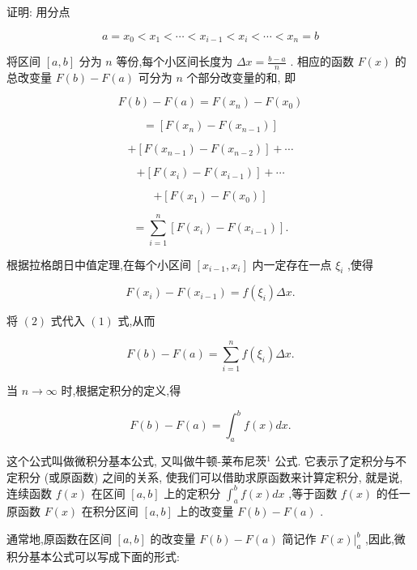 \documentclass[lang=cn,newtx,12pt,scheme=chinese]{elegantbook}
\begin{document}
证明: 用分点

\[
a = {x}_{0} < {x}_{1} < \cdots < {x}_{i - 1} < {x}_{i} < \cdots < {x}_{n} = b
\]

将区间 \(\left\lbrack {a,b}\right\rbrack\) 分为 \(n\) 等份,每个小区间长度为 \({\Delta x} = \frac{b - a}{n}\) . 相应的函数 \(F\left( x\right)\) 的总改变量 \(F\left( b\right) - F\left( a\right)\) 可分为 \(n\) 个部分改变量的和, 即

\[
F\left( b\right) - F\left( a\right) = F\left( {x}_{n}\right) - F\left( {x}_{0}\right)
\]

\[
= \left\lbrack {F\left( {x}_{n}\right) - F\left( {x}_{n - 1}\right) }\right\rbrack
\]

\[
+ \left\lbrack {F\left( {x}_{n - 1}\right) - F\left( {x}_{n - 2}\right) }\right\rbrack + \cdots
\]

\[
+ \left\lbrack {F\left( {x}_{i}\right) - F\left( {x}_{i - 1}\right) }\right\rbrack + \cdots
\]

\[
+ \left\lbrack {F\left( {x}_{1}\right) - F\left( {x}_{0}\right) }\right\rbrack
\]

\[
= \mathop{\sum }\limits_{{i = 1}}^{n}\left\lbrack {F\left( {x}_{i}\right) - F\left( {x}_{i - 1}\right) }\right\rbrack \text{.} \tag{1}
\]

根据拉格朗日中值定理,在每个小区间 \(\left\lbrack {{x}_{i - 1},{x}_{i}}\right\rbrack\) 内一定存在一点 \({\xi }_{i}\) ,使得

\[
F\left( {x}_{i}\right) - F\left( {x}_{i - 1}\right) = f\left( {\xi }_{i}\right) {\Delta x}. \tag{2}
\]

将 \(\left( 2\right)\) 式代入 \(\left( 1\right)\) 式,从而

\[
F\left( b\right) - F\left( a\right) = \mathop{\sum }\limits_{{i = 1}}^{n}f\left( {\xi }_{i}\right) {\Delta x}.
\]

当 \(n \rightarrow \infty\) 时,根据定积分的定义,得

\[
F\left( b\right) - F\left( a\right) = {\int }_{a}^{b}f\left( x\right) {dx}.
\]

这个公式叫做微积分基本公式, 又叫做牛顿-莱布尼茨${ }^{1}$ 公式. 它表示了定积分与不定积分 (或原函数) 之间的关系, 使我们可以借助求原函数来计算定积分, 就是说, 连续函数 \(f\left( x\right)\) 在区间 \(\left\lbrack {a,b}\right\rbrack\) 上的定积分 \({\int }_{a}^{b}f\left( x\right) {dx}\) ,等于函数 \(f\left( x\right)\) 的任一原函数 \(F\left( x\right)\) 在积分区间 \(\left\lbrack {a,b}\right\rbrack\) 上的改变量 \(F\left( b\right) - F\left( a\right)\) .

通常地,原函数在区间 \(\left\lbrack {a,b}\right\rbrack\) 的改变量 \(F\left( b\right) - F\left( a\right)\) 简记作 \({\left. F\left( x\right) \right| }_{a}^{b}\) ,因此,微积分基本公式可以写成下面的形式:
\end{document}
